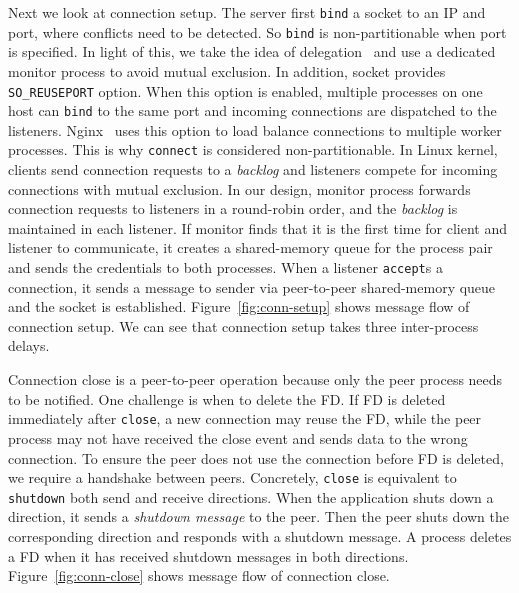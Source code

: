 Next we look at connection setup. The server first \texttt{bind} a socket to an IP and port, where conflicts need to be detected. So \texttt{bind} is non-partitionable when port is specified. In light of this, we take the idea of delegation~\cite{roghanchi2017ffwd} and use a dedicated monitor process to avoid mutual exclusion.
In addition, socket provides \texttt{SO\_REUSEPORT} option. When this option is enabled, multiple processes on one host can \texttt{bind} to the same port and incoming connections are dispatched to the listeners. Nginx~\cite{nginx} uses this option to load balance connections to multiple worker processes. This is why \texttt{connect} is considered non-partitionable. In Linux kernel, clients send connection requests to a \textit{backlog} and listeners compete for incoming connections with mutual exclusion. In our design, monitor process forwards connection requests to listeners in a round-robin order, and the \textit{backlog} is maintained in each listener. If monitor finds that it is the first time for client and listener to communicate, it creates a shared-memory queue for the process pair and sends the credentials to both processes. When a listener \texttt{accept}s a connection, it sends a message to sender via peer-to-peer shared-memory queue and the socket is established. Figure~\ref{fig:conn-setup} shows message flow of connection setup. We can see that connection setup takes three inter-process delays.

Connection close is a peer-to-peer operation because only the peer process needs to be notified. One challenge is when to delete the FD. If FD is deleted immediately after \texttt{close}, a new connection may reuse the FD, while the peer process may not have received the close event and sends data to the wrong connection. To ensure the peer does not use the connection before FD is deleted, we require a handshake between peers.
Concretely, \texttt{close} is equivalent to \texttt{shutdown} both send and receive directions. When the application shuts down a direction, it sends a \textit{shutdown message} to the peer. Then the peer shuts down the corresponding direction and responds with a shutdown message. A process deletes a FD when it has received shutdown messages in both directions. Figure~\ref{fig:conn-close} shows message flow of connection close.


